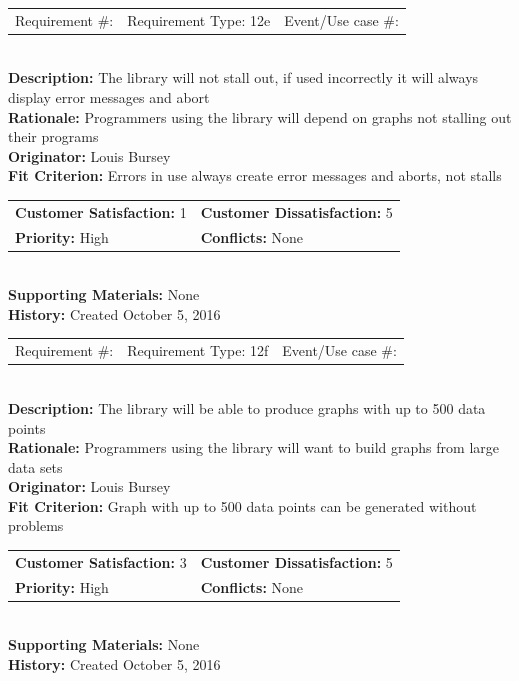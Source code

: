\documentclass[12pt, titlepage]{article}
\begin{document}
%
%
\begin{reqbox}
\begin{tabular}{ccc}
Requirement \#: & Requirement Type: 12e & Event/Use case \#: \\
\end{tabular} \\
\textbf{Description:} The library will not stall out, if used incorrectly it will always display error messages and abort\\
\textbf{Rationale:} Programmers using the library will depend on graphs not stalling out their programs \\
\textbf{Originator:} Louis Bursey\\
\textbf{Fit Criterion:}    Errors in use always create error messages and aborts, not stalls\\
\begin{tabular}{ll}
\textbf{Customer Satisfaction:} 1 & \textbf{Customer Dissatisfaction:} 5 \\
\textbf{Priority:} High & \textbf{Conflicts:} None\\
\end{tabular} \\
\textbf{Supporting Materials:} None \\
\textbf{History:} Created October 5, 2016
\end{reqbox}
%
%
\begin{reqbox}
\begin{tabular}{ccc}
Requirement \#: & Requirement Type: 12f & Event/Use case \#: \\
\end{tabular} \\
\textbf{Description:} The library will be able to produce graphs with up to 500 data points \\
\textbf{Rationale:} Programmers using the library will want to build graphs from large data sets \\
\textbf{Originator:} Louis Bursey\\
\textbf{Fit Criterion:}  Graph with up to 500 data points can be generated without problems\\
\begin{tabular}{ll}
\textbf{Customer Satisfaction:} 3 & \textbf{Customer Dissatisfaction:} 5 \\
\textbf{Priority:} High & \textbf{Conflicts:} None\\
\end{tabular} \\
\textbf{Supporting Materials:} None \\
\textbf{History:} Created October 5, 2016
\end{reqbox}
%
%
%
\end{document}
